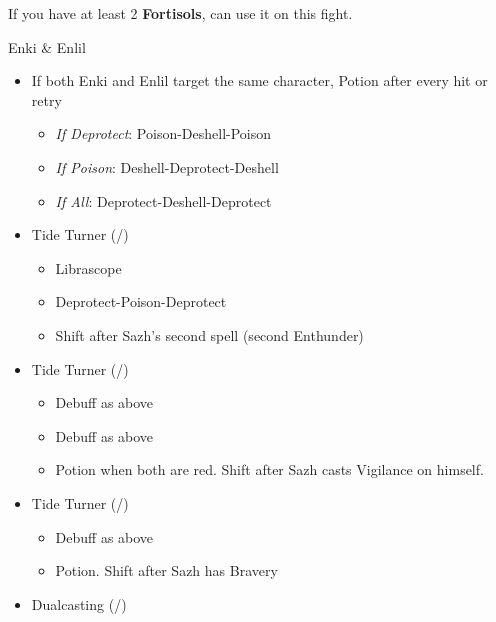 
If you have at least 2 \textbf{Fortisols}, can use it on this fight.
\vfill
\ 

\renewcommand{\first}{[1] Slash \& Burn (\rav/\com)}
\renewcommand{\second}{[2] Tide Turner (\sab/\syn)}
\renewcommand{\third}{[3] Tide Turner (\sab/\syn)}
\renewcommand{\fourth}{[4] Dualcasting (\rav/\rav)}
\renewcommand{\fifth}{[5] Undermine (\sab/\rav)}
\renewcommand{\sixth}{[6] Divide \& Conquer (\sab/\com)}
\begin{battle}[1:43]{Enki \& Enlil}
		\begin{itemize}
			\item If both Enki and Enlil target the same character, Potion after every hit or retry

			      \begin{itemize}
				      \item \textit{If Deprotect}: Poison-Deshell-Poison
				      \item \textit{If Poison}: Deshell-Deprotect-Deshell
				      \item \textit{If All}: Deprotect-Deshell-Deprotect
			      \end{itemize}
			\item \second
			      \begin{itemize}
				      \item Librascope
				      \item Deprotect-Poison-Deprotect
				      \item Shift after Sazh's second spell (second Enthunder)
			      \end{itemize}
			\item \third
			      \begin{itemize}
				      \item Debuff as above
				      \item Debuff as above
				      \item Potion when both are red. Shift after Sazh casts Vigilance on himself.
			      \end{itemize}
			\item \second
			      \begin{itemize}
				      \item Debuff as above
				      \item Potion. Shift after Sazh has Bravery
			      \end{itemize}
			\item \fourth
			      \begin{itemize}

\end{itemize}
\end{itemize}
\end{battle}
